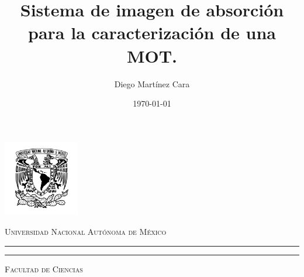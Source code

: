 \documentclass[12pt,twoside]{article}
\title{Sistema de imagen de absorción para la caracterización de una MOT.}								%
\author{Diego Martínez Cara}								%
\date{\today}											%
\begin{document}
\thispagestyle{empty}

\begin{minipage}[c][0.1\textheight][c]{0.2\textwidth}
\begin{center}
    \includegraphics[width=3.3cm, height=3.3cm]{unam.png}
\end{center}
\end{minipage}
\begin{minipage}[c][0.1\textheight][t]{0.85\textwidth}
\begin{center}
    {\scshape Universidad Nacional Aut\'onoma de M\'exico}
    \vspace{.3cm}
    \hrule height2.5pt
    \vspace{.1cm}
    \hrule height1pt
    \vspace{.3cm}
    {\scshape  Facultad de Ciencias}
\end{center}
\end{minipage}
\end{document}
